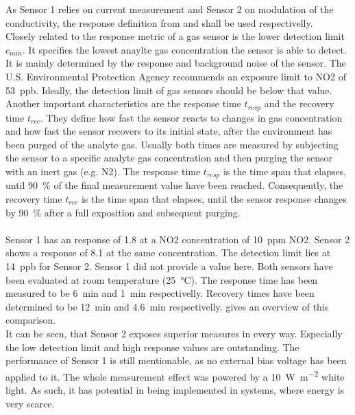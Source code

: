 As Sensor 1 relies on current measurement and Sensor 2 on modulation of the conductivity, the response definition from  and  shall be used respectivelly. \\ 
Closely related to the response metric of a gas sensor is the lower detection limit $c_{min}$. It specifies the lowest anaylte gas concentration the sensor is able to detect. It is mainly determined by the response and background noise of the sensor. The U.S. Environmental Protection Agency recommends an exposure limit to NO2 of \SI{53}{ppb}. Ideally, the detection limit of gas sensors should be below that value. \\
Another important characteristics are the response time $t_{resp}$ and the recovery time $t_{rec}$. They define how fast the sensor reacts to changes in gas concentration and how fast the sensor recovers to its initial state, after the environment has been purged of the analyte gas. Usually both times are measured by subjecting the sensor to a specific analyte gas concentration and then purging the sensor with an inert gas (e.g. N2). The response time $t_{resp}$ is the time span that elapses, until \SI{90}{\percent} of the final measurement value have been reached. Consequently, the recovery time $t_{rec}$ is the time span that elapses, until the sensor response changes by \SI{90}{\percent} after a full exposition and subsequent purging.   \\
\\
Sensor 1 has an response of 1.8 at a NO2 concentration of \SI{10}{ppm} NO2. Sensor 2 shows a response of 8.1 at the same concentration. The detection limit lies at \SI{14}{ppb} for Sensor 2. Sensor 1 did not provide a value here. Both sensors have been evaluated at room temperature (\SI{25}{\celsius}). The response time has been measured to be \SI{6}{\minute} and \SI{1}{\minute} respectivelly.  Recovery times have been determined to be \SI{12}{\minute} and \SI{4.6}{\minute} respectivelly.  gives an overview of this comparison.\\
It can be seen, that Sensor 2 exposes superior measures in every way. Especially the low detection limit and high response values are outstanding. The performance of Sensor 1 is still mentionable, as no external bias voltage has been applied to it. The whole measurement effect was powered by a \SI{10}{\watt\per\meter^2} white light. As such, it has potential in being implemented in systems, where energy is very scarce.

